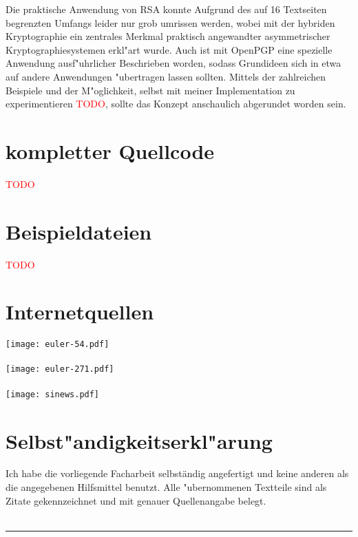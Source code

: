 \documentclass[12pt]{article}
\newcommand{\todo}[1]{\textcolor{red}{\mbox{TODO}}\marginpar{\textcolor{red}{#1}}}
\begin{document}
Die praktische Anwendung von RSA konnte Aufgrund des auf 16 Textseiten begrenzten Umfangs leider
nur grob umrissen werden, wobei mit der hybriden Kryptographie ein zentrales
Merkmal praktisch angewandter asymmetrischer Kryptographiesystemen erkl"art wurde.
Auch ist mit OpenPGP eine spezielle Anwendung ausf"uhrlicher Beschrieben worden,
sodass Grundideen sich in etwa auf andere Anwendungen "ubertragen lassen sollten.
Mittels der zahlreichen Beispiele und der M"oglichkeit, selbst mit meiner Implementation
zu experimentieren \todo{Machen}, sollte das Konzept anschaulich abgerundet worden sein.

\appendix



\section{kompletter Quellcode}
\todo{sind ca. 30 Seiten}
\lstset{language=Python}
%
%
%
%
%
%
%
%
%
%

\section{Beispieldateien}

\todo{Hochladen}

\section{Internetquellen}

\paragraph{\cite{euler41}}
\texttt{[image: euler-54.pdf]}
\paragraph{\cite{euler63}}
\texttt{[image: euler-271.pdf]}
\paragraph{\cite{sinews}}
\texttt{[image: sinews.pdf]}

\section{Selbst"andigkeitserkl"arung}
Ich habe die vorliegende Facharbeit selbständig angefertigt und keine anderen als die angegebenen Hilfsmittel benutzt.
Alle "ubernommenen Textteile sind als Zitate gekennzeichnet und mit genauer Quellenangabe belegt. \\~\\
\rule{0.3\textwidth}{1pt}~\\
\piisignature
\end{document}
